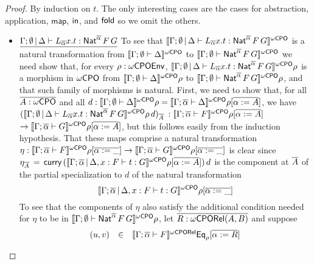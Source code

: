 \documentclass[acmsmall,review,anonymous]{acmart}
\theoremstyle{definition}
\newcommand{\map}{\mathsf{map}}
\begin{document}
\begin{proof}
By induction on $t$. The only interesting cases are the cases for
abstraction, application, $\map$, $\mathsf{in}$, and $\mathsf{fold}$ so we omit the
others.   
\begin{itemize}


\item 
$\underline{\Gamma; \emptyset \,|\, \Delta \vdash L_{\overline{\alpha}}
  x.t : \mathsf{Nat}^{\overline{\alpha}} \,F \,G}$ \;
  To see that $\llbracket{\Gamma; \emptyset
    \,|\, \Delta \vdash L_{\overline{\alpha}} x.t :
    \mathsf{Nat}^{\overline{\alpha}} \,F \,G}\rrbracket^{{\omega\mathsf{CPO}}}$ is a natural transformation
  from $\llbracket{\Gamma; \emptyset \vdash \Delta}\rrbracket^{{\omega\mathsf{CPO}}}$ to
  $\llbracket{\Gamma; \emptyset \vdash \mathsf{Nat}^{\overline{\alpha}} \,F \,G}\rrbracket^{{\omega\mathsf{CPO}}}$
  we need show that, for every $\rho : \omega\mathsf{CPOEnv}$,
  $\llbracket{\Gamma; \emptyset \,|\, \Delta \vdash L_{\overline{\alpha}}
    x.t : \mathsf{Nat}^{\overline{\alpha}} \,F \,G}\rrbracket^{{\omega\mathsf{CPO}}}\rho$ is a morphism in
  ${\omega\mathsf{CPO}}$ from $\llbracket{\Gamma; \emptyset \vdash \Delta}\rrbracket^{{\omega\mathsf{CPO}}}\rho$ to
  $\llbracket{\Gamma; \emptyset \vdash \mathsf{Nat}^{\overline{\alpha}} \,F
    \,G}\rrbracket^{{\omega\mathsf{CPO}}}\rho$, and that such family of morphisms is natural.
  First, we need to show that, for all $\overline{A : {\omega\mathsf{CPO}}}$ and all $d :
  \llbracket{\Gamma; \emptyset \vdash \Delta}\rrbracket^{{\omega\mathsf{CPO}}}\rho = \llbracket{\Gamma;
    \overline{\alpha} \vdash \Delta}\rrbracket^{{\omega\mathsf{CPO}}}\rho[\overline{\alpha := A}]$, we have
  $(\llbracket{\Gamma; \emptyset \,|\, \Delta \vdash L_{\overline{\alpha}}
    x.t : \mathsf{Nat}^{\overline{\alpha}} \,F \,G}\rrbracket^{{\omega\mathsf{CPO}}}\rho\,d)_{\overline{A}}$ $:
  \llbracket{\Gamma; \overline{\alpha} \vdash F}\rrbracket^{{\omega\mathsf{CPO}}}\rho[\overline{\alpha := A}]$
  $\to \llbracket{\Gamma; \overline{\alpha} \vdash G}\rrbracket^{{\omega\mathsf{CPO}}}\rho[\overline{\alpha :=
      A}]$, but this follows easily from the induction hypothesis.
That these maps comprise a natural transformation $\eta :
\llbracket{\Gamma; \overline{\alpha} \vdash F}\rrbracket^{{\omega\mathsf{CPO}}}\rho[\overline{\alpha := \_}] \to
\llbracket{\Gamma; \overline{\alpha} \vdash G}\rrbracket^{{\omega\mathsf{CPO}}}\rho[\overline{\alpha := \_}]$ is
clear since $\eta_{\overline{A}} \, = \, \mathsf{curry}\,
(\llbracket{\Gamma; \overline{\alpha} \,|\, \Delta, x : F \vdash t:
  G}\rrbracket^{{\omega\mathsf{CPO}}}\rho[\overline{\alpha := A}])\,d$ is the component at $\overline{A}$ of
the partial specialization to $d$ of the natural transformation
$$\llbracket{\Gamma; \overline{\alpha} \,|\, \Delta, x : F \vdash t:
  G}\rrbracket^{{\omega\mathsf{CPO}}}\rho[\overline{\alpha := \_}]$$  To see that the components of
$\eta$ also satisfy the additional condition needed for $\eta$ to
be in $\llbracket{\Gamma; \emptyset \vdash \mathsf{Nat}^{\overline{\alpha}} \,F
  \,G}\rrbracket^{{\omega\mathsf{CPO}}}\rho$, let $\overline{R : {\omega\mathsf{CPORel}}(A, B)}$ and suppose
\[\begin{array}{lll}
(u, v) &  \in & \llbracket{\Gamma;\overline{\alpha} \vdash F}\rrbracket^{{\omega\mathsf{CPORel}}}
\mathsf{Eq}_{\rho}[\overline{\alpha := R}]\\

\end{array}\]
\end{itemize}
\end{proof}
\end{document}
